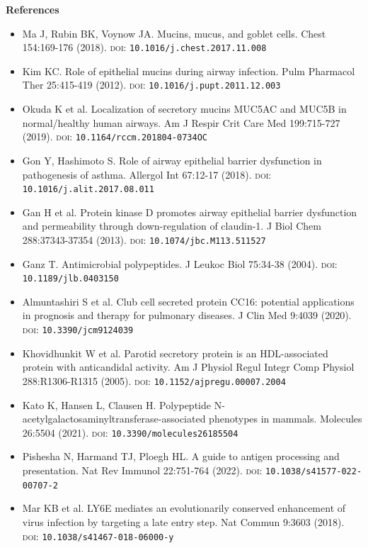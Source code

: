 \documentclass[10pt]{article}
\begin{document}
\vspace{4pt}
{\footnotesize\textbf{References}\par}
{\scriptsize
\begin{itemize}[leftmargin=2.2em,itemsep=1pt,topsep=2pt]
\item[1.] Ma J, Rubin BK, Voynow JA. Mucins, mucus, and goblet cells. Chest 154:169-176 (2018). \textsc{doi}: \texttt{10.1016/j.chest.2017.11.008}
\item[2.] Kim KC. Role of epithelial mucins during airway infection. Pulm Pharmacol Ther 25:415-419 (2012). \textsc{doi}: \texttt{10.1016/j.pupt.2011.12.003}
\item[3.] Okuda K et al. Localization of secretory mucins MUC5AC and MUC5B in normal/healthy human airways. Am J Respir Crit Care Med 199:715-727 (2019). \textsc{doi}: \texttt{10.1164/rccm.201804-0734OC}
\item[4.] Gon Y, Hashimoto S. Role of airway epithelial barrier dysfunction in pathogenesis of asthma. Allergol Int 67:12-17 (2018). \textsc{doi}: \texttt{10.1016/j.alit.2017.08.011}
\item[5.] Gan H et al. Protein kinase D promotes airway epithelial barrier dysfunction and permeability through down-regulation of claudin-1. J Biol Chem 288:37343-37354 (2013). \textsc{doi}: \texttt{10.1074/jbc.M113.511527}
\item[6.] Ganz T. Antimicrobial polypeptides. J Leukoc Biol 75:34-38 (2004). \textsc{doi}: \texttt{10.1189/jlb.0403150}
\item[7.] Almuntashiri S et al. Club cell secreted protein CC16: potential applications in prognosis and therapy for pulmonary diseases. J Clin Med 9:4039 (2020). \textsc{doi}: \texttt{10.3390/jcm9124039}
\item[8.] Khovidhunkit W et al. Parotid secretory protein is an HDL-associated protein with anticandidal activity. Am J Physiol Regul Integr Comp Physiol 288:R1306-R1315 (2005). \textsc{doi}: \texttt{10.1152/ajpregu.00007.2004}
\item[9.] Kato K, Hansen L, Clausen H. Polypeptide N-acetylgalactosaminyltransferase-associated phenotypes in mammals. Molecules 26:5504 (2021). \textsc{doi}: \texttt{10.3390/molecules26185504}
\item[10.] Pishesha N, Harmand TJ, Ploegh HL. A guide to antigen processing and presentation. Nat Rev Immunol 22:751-764 (2022). \textsc{doi}: \texttt{10.1038/s41577-022-00707-2}
\item[11.] Mar KB et al. LY6E mediates an evolutionarily conserved enhancement of virus infection by targeting a late entry step. Nat Commun 9:3603 (2018). \textsc{doi}: \texttt{10.1038/s41467-018-06000-y}

\end{itemize}}
\end{document}
